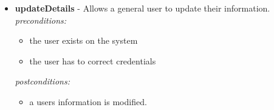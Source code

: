 \documentclass[a4paper,12pt]{article}
\begin{document}
\begin{itemize}
		\item \textbf{updateDetails} - Allows a general user to update their information.\\[0.5cm]
		\textit{preconditions:}
		\begin{itemize}
			\item the user exists on the system
			\item the user has to correct credentials
		\end{itemize}
		
		\textit{postconditions:}
		\begin{itemize}
			\item a users information is modified.
		\end{itemize}
	\end{itemize}
	 
	 
\end{document}
